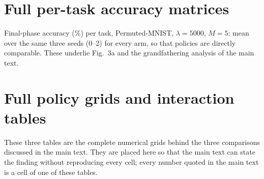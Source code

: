 \documentclass[11pt]{article}
\begin{document}
\section{Full per-task accuracy matrices}
\label{appx:matrices}

\begin{sloppypar}
Final-phase accuracy (\%) per task, Permuted-MNIST, $\lambda{=}5000$,
$M{=}5$: mean over the same three seeds (0--2) for every arm,
so that policies are directly comparable. These underlie Fig.~3a and the grandfathering
analysis of the main text.
\end{sloppypar}

\begin{table}[h]
\centering\small
\caption{Final-phase accuracy (\%) per task on Permuted-MNIST at
$T{=}10$, $\lambda{=}5000$, $M{=}5$, mean over seeds 0--2 for every arm.}
\label{tab:appx-t10}

\end{table}

\begin{table}[h]
\centering\small
\caption{Final-phase accuracy (\%) per task on Permuted-MNIST at
$T{=}20$, $\lambda{=}5000$, $M{=}5$, mean over seeds 0--2 for every arm.}
\label{tab:appx-t20}

\end{table}


\section{Full policy grids and interaction tables}
\label{appx:tables}

These three tables are the complete numerical grids behind the three
comparisons discussed in the main text. They are placed here so that the
main text can state the finding without reproducing every cell; every
number quoted in the main text is a cell of one of these tables.
\end{document}
